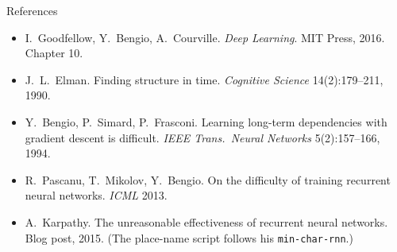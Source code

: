 \documentclass[aspectratio=169,10pt]{beamer}
\begin{document}
\begin{frame}[plain]
\begin{columns}[T]
  \end{columns}
\end{frame}

\begin{frame}{References}
  \small
  \begin{itemize}[<1->]
    \item I.\ Goodfellow, Y.\ Bengio, A.\ Courville. \emph{Deep Learning}. MIT Press, 2016. Chapter 10.
    \item J.\ L.\ Elman. Finding structure in time. \emph{Cognitive Science} 14(2):179--211, 1990.
    \item Y.\ Bengio, P.\ Simard, P.\ Frasconi. Learning long-term dependencies with gradient descent is difficult. \emph{IEEE Trans.\ Neural Networks} 5(2):157--166, 1994.
    \item R.\ Pascanu, T.\ Mikolov, Y.\ Bengio. On the difficulty of training recurrent neural networks. \emph{ICML} 2013.
    \item A.\ Karpathy. The unreasonable effectiveness of recurrent neural networks. Blog post, 2015. (The place-name script follows his \texttt{min-char-rnn}.)
  \end{itemize}
\end{frame}
\end{document}
